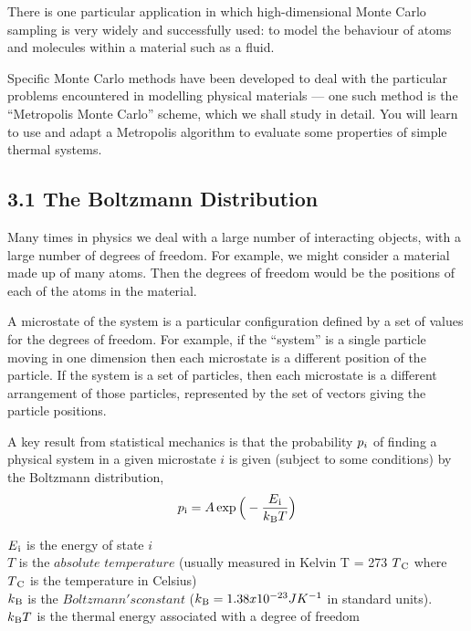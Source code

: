 \documentclass[12pt]{article}
\begin{document}
There is one particular application in which high-dimensional Monte Carlo sampling is very widely
and successfully used: to model the behaviour of atoms and molecules within a material such as a
fluid.

Specific Monte Carlo methods have been developed to deal with the particular problems
encountered in modelling physical materials — one such method is the “Metropolis Monte Carlo”
scheme, which we shall study in detail. You will learn to use and adapt a Metropolis algorithm to
evaluate some properties of simple thermal systems.


\subsection*{3.1 The Boltzmann Distribution}

Many times in physics we deal with a large number of interacting objects, with a large number of degrees of freedom. For example, we might consider a material made up of many atoms. Then the degrees of freedom would be the positions of each of the atoms in the material.

A microstate of the system is a particular configuration defined by a set of values for the degrees of freedom. For example, if the “system” is a single particle moving in one dimension then each microstate is a different position of the particle. If the system is a set of particles, then each microstate is a different arrangement of those particles, represented by the set of vectors giving the particle positions.

A key result from statistical mechanics is that the probability $p\textsubscript{$i$}$ of finding a physical system in a given microstate $i$ is given (subject to some conditions) by the Boltzmann distribution,
 \begin{align} 
p\textsubscript{i} = A\exp \Big( - \frac{E\textsubscript{i}}{k\textsubscript{B} T}\Big)
\end{align}

$E\textsubscript{i}$ is the energy of state $i$ \\
$T$ is the $absolute$ $temperature$ (usually measured in Kelvin T = 273 $T\textsubscript{C}$
where $T\textsubscript{C}$ is the temperature in Celsius) \\
$k\textsubscript{B}$ is the $Boltzmann's constant$ ($k\textsubscript{B} = 1.38 x 10^{-23}JK^{-1}$ in standard units). \\
$k\textsubscript{B}T$ is the thermal energy associated with a degree of freedom
\end{document}
